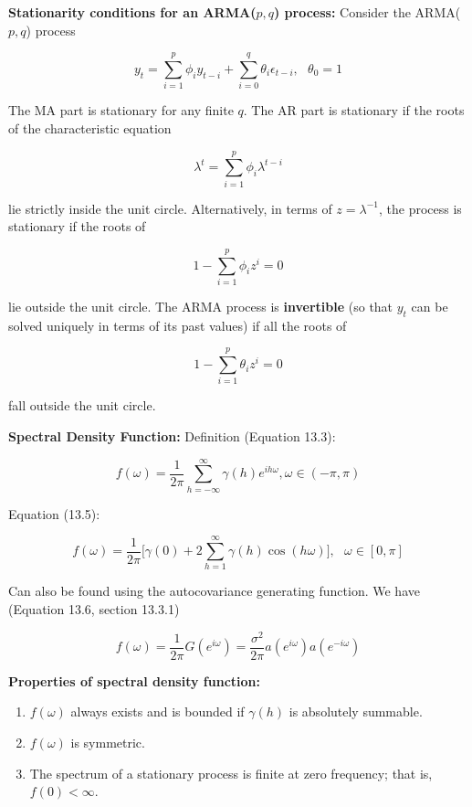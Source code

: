 \documentclass{article}
\begin{document}
\textbf{Stationarity conditions for an ARMA(\(p,q\)) process:} Consider the ARMA(\(p, q\)) process 

\[
y_t = \sum_{i=1}^p \phi_i y_{t-i} + \sum_{i=0}^q \theta_i \epsilon_{t-i}, \ \ \ \theta_0 = 1
\]

The MA part is stationary for any finite \(q\). The AR part is stationary if the roots of the characteristic equation

\[
\lambda^t = \sum_{i=1}^p \phi_i \lambda^{t-i}
\]

lie strictly inside the unit circle. Alternatively, in terms of \(z = \lambda^{-1}\), the process is stationary if the roots of 

\[
1 - \sum_{i=1}^p \phi_i z^i = 0
\]

lie outside the unit circle. The ARMA process is \textbf{invertible} (so that \(y_t\) can be solved uniquely in terms of its past values) if all the roots of 

\[
1 - \sum_{i=1}^p \theta_i z^i = 0
\]

fall outside the unit circle.

\textbf{Spectral Density Function:} Definition (Equation 13.3):

\[
f(\omega) = \frac{1}{2 \pi} \sum_{h = - \infty}^\infty \gamma(h) e^{i h \omega}, \omega \in (-\pi, \pi)
\]

Equation (13.5):

\[
f(\omega) = \frac{1}{2\pi} \bigg[ \gamma(0) + 2 \sum_{h=1}^\infty \gamma(h) \cos(h \omega) \bigg], \ \ \ \omega \in [0, \pi]
\]

Can also be found using the autocovariance generating function. We have (Equation 13.6, section 13.3.1)

\[
f(\omega) = \frac{1}{2\pi}G(e^{i \omega}) = \frac{\sigma^2}{2 \pi} a(e^{i \omega}) a(e^{- i \omega})
\]

\textbf{Properties of spectral density function:}

\begin{enumerate}[(1)]

\item \(f(\omega)\) always exists and is bounded if \(\gamma(h)\) is absolutely summable.

\item \(f(\omega)\) is symmetric.

\item The spectrum of a stationary process is finite at zero frequency; that is, \(f(0) < \infty\).

\end{enumerate}
\end{document}
